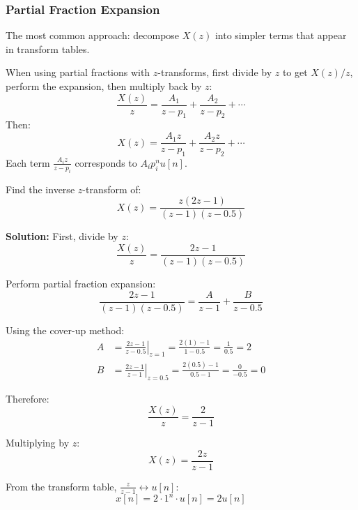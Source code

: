 \subsubsection{Partial Fraction Expansion}
The most common approach: decompose $X(z)$ into simpler terms that appear in transform tables.

\begin{keyconceptbox}[title=Partial Fraction for $z$-Transforms]
When using partial fractions with $z$-transforms, first divide by $z$ to get $X(z)/z$, perform the expansion, then multiply back by $z$:
\begin{equation}
\frac{X(z)}{z} = \frac{A_1}{z-p_1} + \frac{A_2}{z-p_2} + \cdots
\end{equation}
Then:
\begin{equation}
X(z) = \frac{A_1 z}{z-p_1} + \frac{A_2 z}{z-p_2} + \cdots
\end{equation}
Each term $\frac{A_i z}{z-p_i}$ corresponds to $A_i p_i^n u[n]$.
\end{keyconceptbox}

\begin{examplebox}[title=Example: Inverse $z$-Transform by Partial Fractions]
Find the inverse $z$-transform of:
\begin{equation}
X(z) = \frac{z(2z - 1)}{(z-1)(z-0.5)}
\end{equation}

\textbf{Solution:}
First, divide by $z$:
\begin{equation}
\frac{X(z)}{z} = \frac{2z - 1}{(z-1)(z-0.5)}
\end{equation}

Perform partial fraction expansion:
\begin{equation}
\frac{2z - 1}{(z-1)(z-0.5)} = \frac{A}{z-1} + \frac{B}{z-0.5}
\end{equation}

Using the cover-up method:
\begin{align}
A &= \left.\frac{2z-1}{z-0.5}\right|_{z=1} = \frac{2(1)-1}{1-0.5} = \frac{1}{0.5} = 2 \\
B &= \left.\frac{2z-1}{z-1}\right|_{z=0.5} = \frac{2(0.5)-1}{0.5-1} = \frac{0}{-0.5} = 0
\end{align}

Therefore:
\begin{equation}
\frac{X(z)}{z} = \frac{2}{z-1}
\end{equation}

Multiplying by $z$:
\begin{equation}
X(z) = \frac{2z}{z-1}
\end{equation}

From the transform table, $\frac{z}{z-1} \leftrightarrow u[n]$:
\begin{equation}
\boxed{x[n] = 2 \cdot 1^n \cdot u[n] = 2u[n]}
\end{equation}
\end{examplebox}

